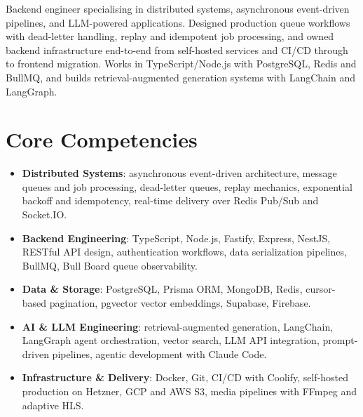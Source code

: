 \documentclass[11pt,a4paper,sans]{moderncv}
\begin{document}
\makecvtitle


\vspace{6pt}
\small{Backend engineer specialising in distributed systems, asynchronous event-driven pipelines, and LLM-powered applications. Designed production queue workflows with dead-letter handling, replay and idempotent job processing, and owned backend infrastructure end-to-end from self-hosted services and CI/CD through to frontend migration. Works in TypeScript/Node.js with PostgreSQL, Redis and BullMQ, and builds retrieval-augmented generation systems with LangChain and LangGraph.}


\section{Core Competencies}
\vspace{1pt}
\begin{itemize}

\item \textbf{Distributed Systems}: asynchronous event-driven architecture, message queues and job processing, dead-letter queues, replay mechanics, exponential backoff and idempotency, real-time delivery over Redis Pub/Sub and Socket.IO.

\item \textbf{Backend Engineering}: TypeScript, Node.js, Fastify, Express, NestJS, RESTful API design, authentication workflows, data serialization pipelines, BullMQ, Bull Board queue observability.

\item \textbf{Data \& Storage}: PostgreSQL, Prisma ORM, MongoDB, Redis, cursor-based pagination, pgvector vector embeddings, Supabase, Firebase.

\item \textbf{AI \& LLM Engineering}: retrieval-augmented generation, LangChain, LangGraph agent orchestration, vector search, LLM API integration, prompt-driven pipelines, agentic development with Claude Code.

\item \textbf{Infrastructure \& Delivery}: Docker, Git, CI/CD with Coolify, self-hosted production on Hetzner, GCP and AWS S3, media pipelines with FFmpeg and adaptive HLS.

\end{itemize}
\end{document}
